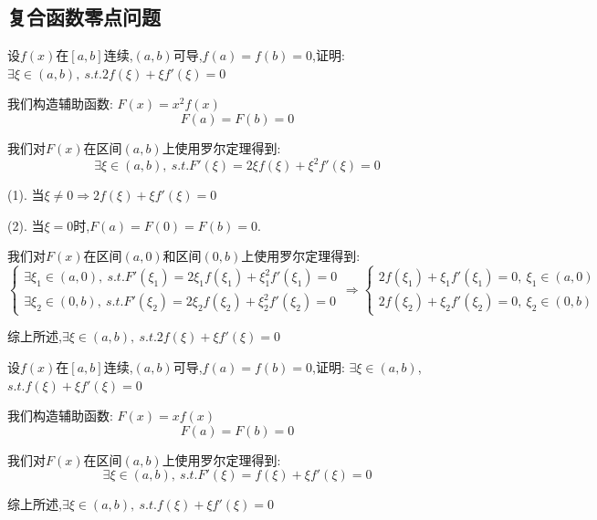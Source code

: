 \subsection{复合函数零点问题}

\begin{proposition}
	设$f(x)$在$[a,b]$连续,$(a,b)$可导,$f(a)=f(b)=0$,证明: $\exists \xi\in(a,b),\ s.t. 2f(\xi)+\xi f'(\xi)=0$
\end{proposition}
\begin{solution}

	我们构造辅助函数:  $F(x)=x^2f(x)$
	$$F(a)=F(b)=0$$

	我们对$F(x)$在区间$(a,b)$上使用罗尔定理得到:
	$$\exists \xi\in(a,b),\ s.t. F'(\xi)=2\xi f(\xi)+\xi^2f'(\xi)=0$$

	(1). 当$\xi\neq 0\Rightarrow 2f(\xi)+\xi f'(\xi)=0$

	(2). 当$\xi=0$时,$F(a)=F(0)=F(b)=0$.

	我们对$F(x)$在区间$(a,0)$和区间$(0,b)$上使用罗尔定理得到:
	$$\left\lbrace
		\begin{array}{l}
			\exists \xi_{1}\in(a,0),\ s.t. F'(\xi_{1})=2\xi_{1} f(\xi_{1})+\xi_{1}^2f'(\xi_{1})=0 \\
			\exists \xi_{2}\in(0,b),\ s.t. F'(\xi_{2})=2\xi_{2} f(\xi_{2})+\xi_{2}^2f'(\xi_{2})=0
		\end{array}
		\right. \Rightarrow\left\lbrace
		\begin{array}{l}
			2f(\xi_{1})+\xi_{1}f'(\xi_{1})=0,\ \xi_{1}\in(a,0) \\
			2f(\xi_{2})+\xi_{2}f'(\xi_{2})=0,\ \xi_{2}\in(0,b)
		\end{array}
		\right. $$

	综上所述,$\exists \xi\in(a,b),\ s.t. 2f(\xi)+\xi f'(\xi)=0$
\end{solution}


\begin{proposition}
	设$f(x)$在$[a,b]$连续,$(a,b)$可导,$f(a)=f(b)=0$,证明: $\exists \xi\in(a,b)$, $s.t. f(\xi)+\xi f'(\xi)=0$
\end{proposition}
\begin{solution}

	我们构造辅助函数:  $F(x)=xf(x)$
	$$F(a)=F(b)=0$$

	我们对$F(x)$在区间$(a,b)$上使用罗尔定理得到:
	$$\exists \xi\in(a,b),\ s.t. F'(\xi)= f(\xi)+\xi f'(\xi)=0$$

	综上所述,$\exists \xi\in(a,b),\ s.t. f(\xi)+\xi f'(\xi)=0$
\end{solution}

